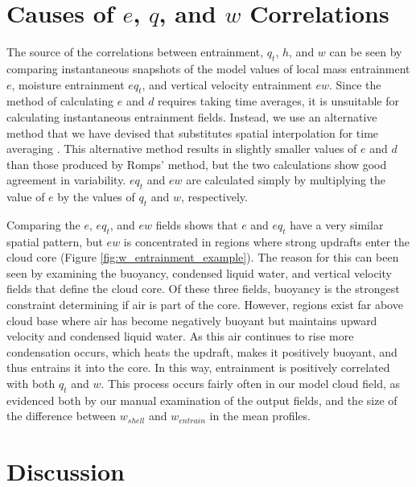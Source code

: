 \documentclass[12pt]{article}
\begin{document}

\section{Causes of $e$, $q$, and $w$ Correlations}

The source of the correlations between entrainment, $q_t$, $h$, and $w$ can 
be seen by comparing instantaneous snapshots of the model values of local mass entrainment $e$, moisture entrainment $e{q_t}$, and vertical velocity 
entrainment $e{w}$.  Since the \cite{Romps2010} method of calculating 
$e$ and $d$ requires taking time averages, it is unsuitable for calculating instantaneous entrainment fields.  Instead, we use an alternative method that 
we have devised that substitutes spatial interpolation for time averaging 
\citep{Dawe2011}.  This alternative method results in slightly smaller values 
of $e$ and $d$ than those produced by Romps' method, but the two calculations
show good agreement in variability. $eq_t$ and $ew$ are calculated simply by
multiplying the value of $e$ by the values of $q_t$ and $w$, respectively.

Comparing the $e$, $eq_t$, and $ew$ fields shows that $e$ and $eq_t$ have a 
very similar spatial pattern, but $ew$ is concentrated in regions where strong
updrafts enter the cloud core (Figure \ref{fig:w_entrainment_example}).  The
reason for this can been seen by examining the buoyancy, condensed liquid water,
and vertical velocity fields that define the cloud core.  Of these three fields,
buoyancy is the strongest constraint determining if air is part of the core.
However, regions exist far above cloud base where air has become negatively buoyant but maintains upward velocity and condensed liquid water.  As this air
continues to rise more condensation occurs, which heats the updraft, makes it
positively buoyant, and thus entrains it into the core.  In this way, 
entrainment is positively correlated with both $q_t$ and $w$.  This process
occurs fairly often in our model cloud field, as evidenced both by our manual
examination of the output fields, and the size of the difference between 
$w_{shell}$ and $w_{entrain}$ in the mean profiles.


\section{Discussion}
\end{document}

